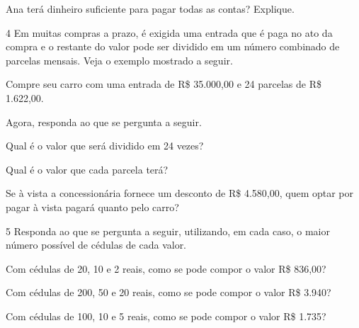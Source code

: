 Ana terá dinheiro suficiente para pagar todas as contas? Explique.



\num{4} Em muitas compras a prazo, é exigida uma entrada que é paga no ato da
compra e o restante do valor pode ser dividido em um número combinado de
parcelas mensais. Veja o exemplo mostrado a seguir.

\begin{mdframed}[linewidth=2pt,linecolor=azul!20,backgroundcolor=azul!20,roundcorner=2pt]
Compre seu carro com uma entrada de R\$ 35.000,00 e 24
parcelas de R\$ 1.622,00.
\end{mdframed}

Agora, responda ao que se pergunta a seguir.

\begin{escolha}
\item
  Qual é o valor que será dividido em 24 vezes?


\item
  Qual é o valor que cada parcela terá?


\item
  Se à vista a concessionária fornece um desconto de R\$ 4.580,00, quem optar por pagar à vista pagará quanto pelo carro?

\end{escolha}

\num{5} Responda ao que se pergunta a seguir, utilizando, em cada caso, o maior número possível de cédulas de cada valor.

\begin{escolha}
\item Com cédulas de 20, 10 e 2 reais, como se pode compor o valor R\$ 836,00?


\item Com cédulas de 200, 50 e 20 reais, como se pode compor o valor R\$ 3.940?


\item Com cédulas de 100, 10 e 5 reais, como se pode compor o valor R\$ 1.735?

\end{escolha}

